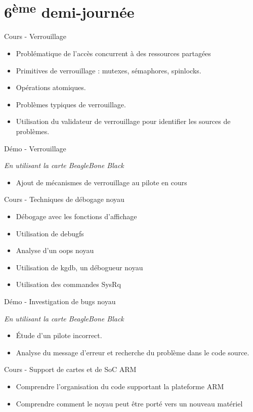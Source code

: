 \documentclass[a4paper,12pt,obeyspaces,spaces,hyphens]{article}
\begin{document}
\section{6\textsuperscript{ème} demi-journée}

\feagendatwocolumn
{Cours - Verrouillage}
{
  \begin{itemize}
  \item Problématique de l'accès concurrent à des ressources partagées
  \item Primitives de verrouillage : mutexes, sémaphores, spinlocks.
  \item Opérations atomiques.
  \item Problèmes typiques de verrouillage.
  \item Utilisation du validateur de verrouillage pour identifier les
    sources de problèmes.
  \end{itemize}
}
{Démo - Verrouillage}
{
  {\em En utilisant la carte BeagleBone Black}
  \begin{itemize}
  \item Ajout de mécanismes de verrouillage au pilote en cours
  \end{itemize}
}

\feagendatwocolumn
{Cours - Techniques de débogage noyau}
{
  \begin{itemize}
  \item Débogage avec les fonctions d'affichage
  \item Utilisation de debugfs
  \item Analyse d'un oops noyau
  \item Utilisation de kgdb, un débogueur noyau
  \item Utilisation des commandes SysRq
  \end{itemize}
}
{Démo - Investigation de bugs noyau}
{
  {\em En utilisant la carte BeagleBone Black}
  \begin{itemize}
  \item Étude d'un pilote incorrect.
  \item Analyse du message d'erreur et recherche du problème dans le code
    source.
  \end{itemize}
}

\feagendaonecolumn
{Cours - Support de cartes et de SoC ARM}
{
  \begin{itemize}
  \item Comprendre l'organisation du code supportant la plateforme ARM
  \item Comprendre comment le noyau peut être porté vers un nouveau
    matériel
  \end{itemize}
}
\end{document}
